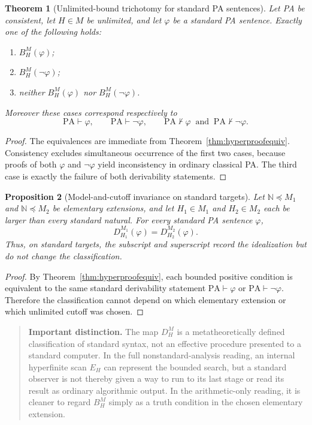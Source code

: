 \documentclass[11pt,openany]{book}
\newtheorem{theorem}{Theorem}[chapter]
\newtheorem{proposition}[theorem]{Proposition}
\theoremstyle{definition}
\theoremstyle{remark}
\newenvironment{warningbox}{\begin{quote}\small\color{red!50!black}\textbf{Important distinction.} }{\end{quote}}
\newcommand{\N}{\mathbb{N}}
\begin{document}
\begin{theorem}[Unlimited-bound trichotomy for standard PA sentences]\label{thm:hypertrichotomy}
Let PA be consistent, let \(H\in M\) be unlimited, and let \(\varphi\) be a standard PA sentence. Exactly one of the following holds:
\begin{enumerate}[label=(\roman*)]
\item \(B_H^M(\varphi)\);
\item \(B_H^M(\neg\varphi)\);
\item neither \(B_H^M(\varphi)\) nor \(B_H^M(\neg\varphi)\).
\end{enumerate}
Moreover these cases correspond respectively to
\[
\mathrm{PA}\vdash\varphi,\qquad
\mathrm{PA}\vdash\neg\varphi,\qquad
\mathrm{PA}\nvdash\varphi\ \text{ and }\ \mathrm{PA}\nvdash\neg\varphi.
\]
\end{theorem}
\begin{proof}
The equivalences are immediate from Theorem~\ref{thm:hyperproofequiv}. Consistency excludes simultaneous occurrence of the first two cases, because proofs of both \(\varphi\) and \(\neg\varphi\) yield inconsistency in ordinary classical PA. The third case is exactly the failure of both derivability statements.
\end{proof}

\begin{proposition}[Model-and-cutoff invariance on standard targets]\label{prop:hyperinvariance}
Let \(\N\preccurlyeq M_1\) and \(\N\preccurlyeq M_2\) be elementary extensions, and let \(H_1\in M_1\) and \(H_2\in M_2\) each be larger than every standard natural. For every standard PA sentence \(\varphi\),
\[
D_{H_1}^{M_1}(\varphi)=D_{H_2}^{M_2}(\varphi).
\]
Thus, on standard targets, the subscript and superscript record the idealization but do not change the classification.
\end{proposition}
\begin{proof}
By Theorem~\ref{thm:hyperproofequiv}, each bounded positive condition is equivalent to the same standard derivability statement \(\mathrm{PA}\vdash\varphi\) or \(\mathrm{PA}\vdash\neg\varphi\). Therefore the classification cannot depend on which elementary extension or which unlimited cutoff was chosen.
\end{proof}

\begin{warningbox}
The map \(D_H^M\) is a metatheoretically defined classification of standard syntax, not an effective procedure presented to a standard computer. In the full nonstandard-analysis reading, an internal hyperfinite scan \(E_H\) can represent the bounded search, but a standard observer is not thereby given a way to run to its last stage or read its result as ordinary algorithmic output. In the arithmetic-only reading, it is cleaner to regard \(B_H^M\) simply as a truth condition in the chosen elementary extension.
\end{warningbox}
\end{document}

